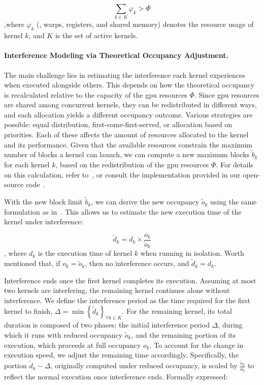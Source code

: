 \begin{equation}\label{eq:occurrence}
	\sum_{k \in K} \varphi_k > \Phi
\end{equation}
,where $\varphi_k$ (\eg, warps, registers, and shared memory) denotes the resource usage of kernel $k$, and $K$ is the set of active kernels.

\paragraph{Interference Modeling via Theoretical Occupancy Adjustment.} The main challenge lies in estimating the interference each kernel experiences when executed alongside others. This depends on how the theoretical occupancy is recalculated relative to the capacity of the \acrshort{gpu} resources $\Phi$. Since \acrshort{gpu} resources are shared among concurrent kernels, they can be redistributed in different ways, and each allocation yields a different occupancy outcome. Various strategies are possible: equal distribution, first-come-first-served, or allocation based on priorities. Each of these affects the amount of resources allocated to the kernel and its performance. Given that the available resources constrain the maximum number of blocks a kernel can launch, we can compute a new maximum blocks $\tilde{b}_k$ for each kernel $k$, based on the redistribution of the \acrshort{gpu} resources $\Phi$. For details on this calculation, refer to~\cite{lim2017autotuninggpukernelsstatic}, or consult the implementation provided in our open-source code~.

With the new block limit $\tilde{b}_k$, we can derive the new occupancy $\tilde{o}_k$ using the same formulation as in~. This allows us to estimate the new execution time of the kernel under interference:

\begin{equation*}
	\tilde{d}_k = d_k \times \frac{o_k}{\tilde{o}_k}
\end{equation*}
, where $d_k$ is the execution time of kernel $k$ when running in isolation. Worth mentioned that, if $o_k = \tilde{o}_k$, then no interference occurs, and $\tilde{d}_k = d_k$.

Interference ends once the first kernel completes its execution. Assuming at most two kernels are interfering, the remaining kernel continues alone without interference. We define the interference period as the time required for the first kernel to finish, $\Delta = \min \left\{ \tilde{d}_k \right\}_{\forall k \in K}$.
For the remaining kernel, its total duration is composed of two phases: the initial interference period $\Delta$, during which it runs with reduced occupancy $\tilde{o}_k$, and the remaining portion of its execution, which proceeds at full occupancy $o_k$. To account for the change in execution speed, we adjust the remaining time accordingly. Specifically, the portion $\tilde{d}_k - \Delta$, originally computed under reduced occupancy, is scaled by $\frac{\tilde{o}_k}{o_k}$ to reflect the normal execution once interference ends. Formally expressed:

